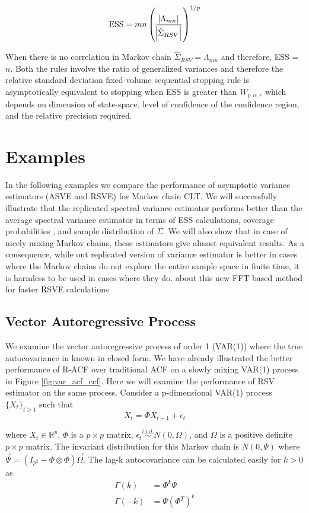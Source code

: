 \documentclass[11pt]{article}
\theoremstyle{remark}
\begin{document}
\[
\text{ESS} = mn\left(\dfrac{\abs{\Lambda_{mn}}}{\abs{\hat{\Sigma}_{RSV}}}\right)^{1/p}
\]

When there is no correlation in Markov chain $\hat{\Sigma}_{RSV} = \Lambda_{mn}$ and therefore, ESS = $n$. Both the rules involve the ratio of generalized variances and therefore the relative standard deviation fixed-volume sequential stopping rule is asymptotically equivalent to stopping when ESS is greater than $W_{p,\alpha,\epsilon}$ which depends on dimension of state-space, level of confidence of the confidence region, and the relative precision required. 

\section{Examples} \label{sec:examples}

In the following examples we compare the performance of asymptotic variance estimators (ASVE and RSVE) for Markov chain CLT. We will successfully illustrate that the replicated spectral variance estimator performs better than the average spectral variance estimator in terms of ESS calculations, coverage probabilities , and sample distribution of $\Sigma$. We will also show that in case of nicely mixing Markov chains, these estimators give almost equivalent results. As a consequence, while out replicated version of variance estimator is better in cases where the Markov chains do not explore the entire sample space in finite time, it is harmless to be used in cases where they do.  
{\color{red}about this new FFT based method for faster RSVE calculations}

\subsection{Vector Autoregressive Process} \label{ex:var}

We examine the vector autoregressive process of order 1 (VAR(1)) where the true autocovariance in known in closed form. We have already illustrated the better performance of R-ACF over traditional ACF on a slowly mixing VAR(1) process in Figure \ref{fig:var_acf_ccf}. Here we will examine the performance of RSV estimator on the same process. Consider a p-dimensional VAR(1) process $\{X_t\}_{t \geq 1}$ such that
%
\[
X_t = \Phi X_{t-1} + \epsilon_t
\]

where $X_t \in \mathbb{R}^p$, $\Phi $ is a $p \times p $ matrix, $ \epsilon_t \overset{i.i.d.}{\sim} N(0, \Omega)$, and $\Omega$ is a positive definite $p \times p$ matrix. The invariant distribution for this Markov chain is $N(0, \Psi)$ where $\Vec{\Psi} = (I_{p^2} - \Phi \otimes \Phi)\Vec{\Omega}$. The lag-k autocovariance can be calculated easily for $k >0$ as
%
\begin{align*}
    \Gamma(k) &= \Phi^k\Psi\\
    \Gamma(-k) &= \Psi(\Phi^T)^k
\end{align*}
\end{document}
